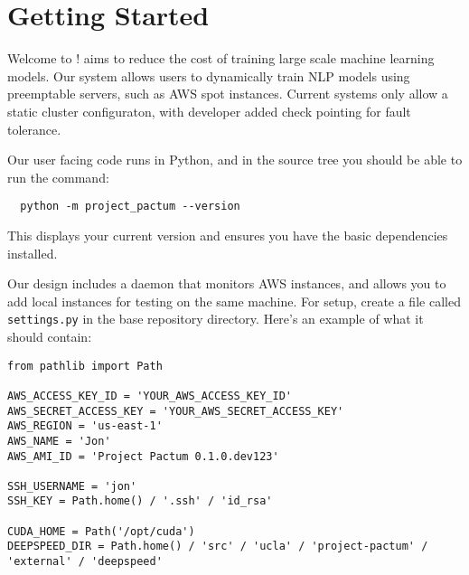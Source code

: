 \chapter{Getting Started}
\label{chap:getting-started}

Welcome to \project{}!
\project{} aims to reduce the cost of training large scale machine learning
models.
Our system allows users to dynamically train NLP models using preemptable
servers, such as AWS spot instances.
Current systems only allow a static cluster configuraton, with developer added
check pointing for fault tolerance.

Our user facing code runs in Python, and in the source tree you should be able
to run the command:
\begin{lstlisting}
  python -m project_pactum --version
\end{lstlisting}
This displays your current version and ensures you have the basic dependencies
installed.

Our design includes a daemon that monitors AWS instances, and allows you to add
local instances for testing on the same machine.
For setup, create a file called \lstinline|settings.py| in the base repository
directory.
Here's an example of what it should contain:
\begin{lstlisting}
from pathlib import Path

AWS_ACCESS_KEY_ID = 'YOUR_AWS_ACCESS_KEY_ID'
AWS_SECRET_ACCESS_KEY = 'YOUR_AWS_SECRET_ACCESS_KEY'
AWS_REGION = 'us-east-1'
AWS_NAME = 'Jon'
AWS_AMI_ID = 'Project Pactum 0.1.0.dev123'

SSH_USERNAME = 'jon'
SSH_KEY = Path.home() / '.ssh' / 'id_rsa'

CUDA_HOME = Path('/opt/cuda')
DEEPSPEED_DIR = Path.home() / 'src' / 'ucla' / 'project-pactum' / 'external' / 'deepspeed'
\end{lstlisting}

